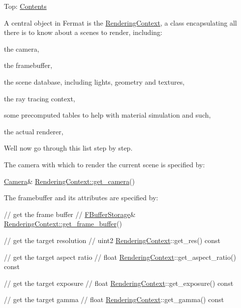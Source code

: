 Top\+: \hyperlink{_overture_contents_page}{Contents}

\begin{DoxyParagraph}{}
A central object in Fermat is the \hyperlink{struct_rendering_context}{Rendering\+Context}, a class encapsulating all there is to know about a scene\textquotesingle{}s to render, including\+: ~\newline

\begin{DoxyItemize}
\item the camera,
\item the framebuffer,
\item the scene database, including lights, geometry and textures,
\item the ray tracing context,
\item some precomputed tables to help with material simulation and such,
\item the actual renderer, 
\end{DoxyItemize}
\end{DoxyParagraph}
\begin{DoxyParagraph}{}
We\textquotesingle{}ll now go through this list step by step.
\end{DoxyParagraph}
\begin{DoxyParagraph}{}
The camera with which to render the current scene is specified by\+: ~\newline

\begin{DoxyCode}
\hyperlink{struct_camera}{Camera}& \hyperlink{struct_rendering_context_aa23f799fc75e822740e23cbe4ffabc64}{RenderingContext::get\_camera}()
\end{DoxyCode}

\end{DoxyParagraph}
\begin{DoxyParagraph}{}
The framebuffer and its attributes are specified by\+: ~\newline

\begin{DoxyCode}
\textcolor{comment}{// get the frame buffer}
\textcolor{comment}{//}
\hyperlink{struct_f_buffer_storage}{FBufferStorage}& \hyperlink{struct_rendering_context_a916dc69fc808c2a2c302513bd34d9601}{RenderingContext::get\_frame\_buffer}()

\textcolor{comment}{// get the target resolution}
\textcolor{comment}{//}
uint2 \hyperlink{struct_rendering_context}{RenderingContext}::get\_res() const

\textcolor{comment}{// get the target aspect ratio}
\textcolor{comment}{//}
\textcolor{keywordtype}{float} \hyperlink{struct_rendering_context}{RenderingContext}::get\_aspect\_ratio() const

\textcolor{comment}{// get the target exposure}
\textcolor{comment}{//}
\textcolor{keywordtype}{float} \hyperlink{struct_rendering_context}{RenderingContext}::get\_exposure() const

\textcolor{comment}{// get the target gamma}
\textcolor{comment}{//}
\textcolor{keywordtype}{float} \hyperlink{struct_rendering_context}{RenderingContext}::get\_gamma() const
\end{DoxyCode}

\end{DoxyParagraph}
